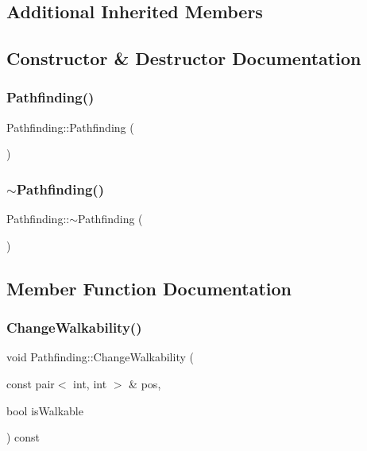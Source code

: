 \subsection*{Additional Inherited Members}


\subsection{Constructor \& Destructor Documentation}
\mbox{\label{class_pathfinding_aae14d204c5f9ee6b184764f874711341}} 
\subsubsection{\texorpdfstring{Pathfinding()}{Pathfinding()}}
{\footnotesize\ttfamily Pathfinding\+::\+Pathfinding (\begin{DoxyParamCaption}{ }\end{DoxyParamCaption})}

\mbox{\label{class_pathfinding_a1869823af12d301105cf1cedbe9a8dc5}} 
\subsubsection{\texorpdfstring{$\sim$Pathfinding()}{~Pathfinding()}}
{\footnotesize\ttfamily Pathfinding\+::$\sim$\+Pathfinding (\begin{DoxyParamCaption}{ }\end{DoxyParamCaption})}



\subsection{Member Function Documentation}
\mbox{\label{class_pathfinding_a8bbd828bcabd0d5f2cf271053cc76a36}} 
\subsubsection{\texorpdfstring{ChangeWalkability()}{ChangeWalkability()}}
{\footnotesize\ttfamily void Pathfinding\+::\+Change\+Walkability (\begin{DoxyParamCaption}\item[{const pair$<$ int, int $>$ \&}]{pos,  }\item[{bool}]{is\+Walkable }\end{DoxyParamCaption}) const}

